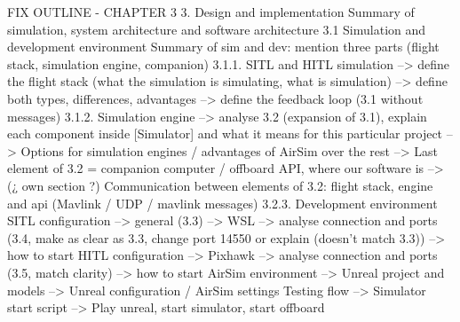 FIX OUTLINE - CHAPTER 3
3. Design and implementation
Summary of simulation, system architecture and software architecture
3.1 Simulation and development environment
Summary of sim and dev: mention three parts (flight stack, simulation engine, companion)
3.1.1. SITL and HITL simulation
        --> define the flight stack (what the simulation is simulating, what is simulation)
        --> define both types, differences, advantages
        --> define the feedback loop (3.1 without messages)
3.1.2. Simulation engine
        --> analyse 3.2 (expansion of 3.1), explain each component inside [Simulator] and what it means for this particular project
        --> Options for simulation engines / advantages of AirSim over the rest
        --> Last element of 3.2 = companion computer / offboard API, where our software is
        --> (¿ own section ?) Communication between elements of 3.2: flight stack, engine and api (Mavlink / UDP / mavlink messages)
3.2.3. Development environment
    SITL configuration
        --> general (3.3)
        --> WSL
        --> analyse connection and ports (3.4, make as clear as 3.3, change port 14550 or explain (doesn't match 3.3))
        --> how to start
    HITL configuration
        --> Pixhawk
        --> analyse connection and ports (3.5, match clarity)
        --> how to start
    AirSim environment
        --> Unreal project and models
        --> Unreal configuration / AirSim settings
    Testing flow
        --> Simulator start script
        --> Play unreal, start simulator, start offboard